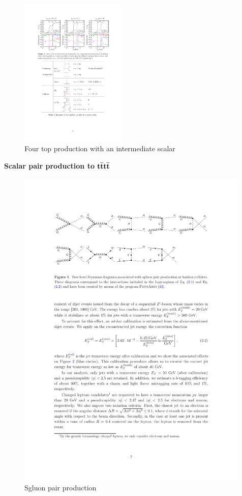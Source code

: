 \begin{figure}[ht!]
\centering
    \includegraphics[width=0.45\textwidth]{images/Theory/ttDMtt.pdf}
    \caption{Four top production with an intermediate scalar~\cite{Arina2016}}
    \label{fig:ttXtt}
\end{figure}



\textbf{Scalar pair production to }$\boldsymbol{\mathrm{t}\overline{\mathrm{t}}\mathrm{t}\overline{\mathrm{t}}}$\\

\begin{figure}[ht!]
\centering
    \includegraphics[width=0.99\textwidth]{images/Theory/sgluonFeyn.pdf}
    \caption{Sgluon pair production~\cite{Calvet:2012rk}}
    \label{fig:sgluonpair}
\end{figure}

